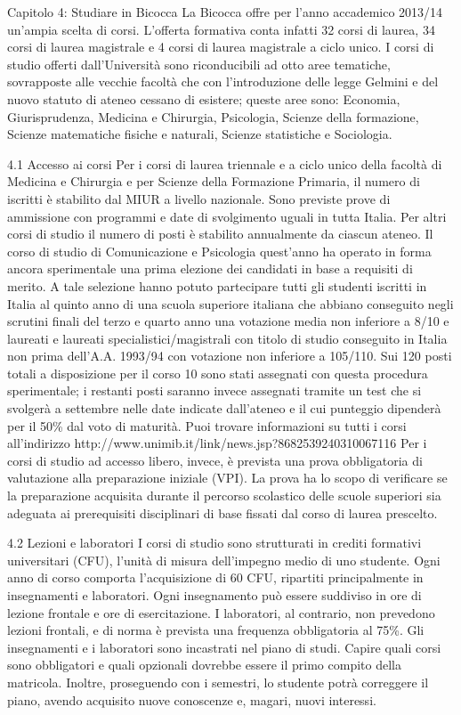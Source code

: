 Capitolo 4: Studiare in Bicocca
La Bicocca offre per l'anno accademico 2013/14 un'ampia scelta di corsi. L'offerta formativa conta infatti 32 corsi di laurea, 34 corsi di laurea magistrale e 4 corsi di laurea magistrale a ciclo unico. I corsi di studio offerti dall'Università sono riconducibili ad otto aree tematiche, sovrapposte alle vecchie facoltà che  con l'introduzione delle legge Gelmini e del nuovo statuto di ateneo cessano di esistere; queste aree sono: Economia, Giurisprudenza, Medicina e Chirurgia, Psicologia, Scienze della formazione, Scienze matematiche fisiche e naturali, Scienze statistiche e Sociologia. 

4.1 Accesso ai corsi 
Per i corsi di laurea triennale e a ciclo unico della facoltà di Medicina e Chirurgia e per Scienze della Formazione Primaria, il numero di iscritti è stabilito dal MIUR a livello nazionale. Sono previste prove di ammissione con programmi e date di svolgimento uguali in tutta Italia. Per altri corsi di studio il numero di posti è stabilito annualmente da ciascun ateneo. Il corso di studio di Comunicazione e Psicologia quest'anno ha operato in forma ancora sperimentale una prima elezione dei candidati in base a requisiti di merito. A tale selezione hanno potuto partecipare tutti gli studenti iscritti in Italia al quinto anno di una scuola superiore italiana che abbiano conseguito negli scrutini finali del terzo e quarto anno una votazione media non inferiore a 8/10 e laureati e laureati specialistici/magistrali con titolo di studio conseguito in Italia non prima dell'A.A. 1993/94 con votazione non inferiore a 105/110. Sui 120 posti totali a disposizione per il corso 10 sono stati assegnati con questa procedura sperimentale; i restanti posti saranno invece assegnati tramite un test che si svolgerà a settembre nelle date indicate dall'ateneo e il cui punteggio dipenderà per il 50\% dal voto di maturità.
Puoi trovare informazioni su tutti i corsi all'indirizzo http://www.unimib.it/link/news.jsp?8682539240310067116
Per i corsi di studio ad accesso libero, invece, è prevista una prova obbligatoria di valutazione alla preparazione iniziale (VPI). La prova ha lo scopo di verificare se la preparazione acquisita durante il percorso scolastico delle scuole superiori sia adeguata ai prerequisiti disciplinari di base fissati dal corso di laurea prescelto. 

4.2 Lezioni e laboratori 
I corsi di studio sono strutturati in crediti formativi universitari (CFU), l'unità di misura dell'impegno medio di uno studente. Ogni anno di corso comporta l'acquisizione di 60 CFU, ripartiti principalmente in insegnamenti e laboratori. Ogni insegnamento può essere suddiviso in ore di lezione frontale e ore di esercitazione. I laboratori, al contrario, non prevedono lezioni frontali, e di norma è prevista una frequenza obbligatoria al 75\%. Gli insegnamenti e i laboratori sono incastrati nel piano di studi. Capire quali corsi sono obbligatori e quali opzionali dovrebbe essere il primo compito della matricola. Inoltre, proseguendo con i semestri, lo studente potrà correggere il piano, avendo acquisito nuove conoscenze e, magari, nuovi interessi. 

